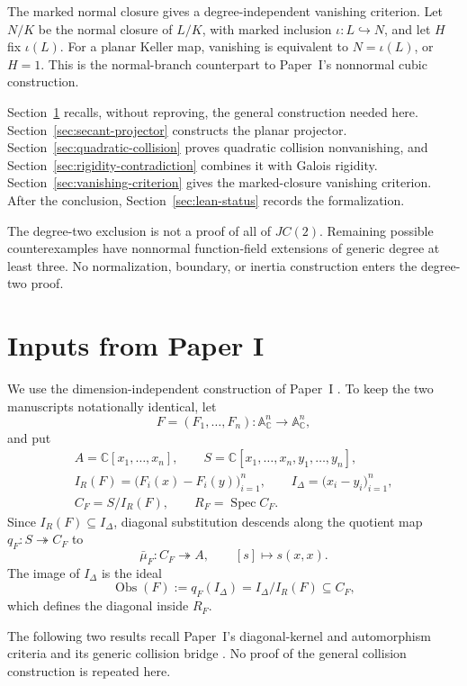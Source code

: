 \documentclass[11pt]{article}
\DeclareMathOperator{\Spec}{Spec}\DeclareMathOperator{\Frac}{Frac}
\newcommand{\A}{\mathbb A}
\newcommand{\C}{\mathbb C}
\newcommand{\Obs}{\operatorname{Obs}}
\begin{document}
The marked normal closure gives a degree-independent vanishing criterion.
Let \(N/K\) be the normal closure of \(L/K\), with marked inclusion
\(\iota\colon L\hookrightarrow N\), and let \(H\) fix \(\iota(L)\).
For a planar Keller map, vanishing is equivalent to \(N=\iota(L)\), or
\(H=1\).  This is the normal-branch counterpart to Paper~I's nonnormal
cubic construction.

Section~\ref{sec:collision-inputs} recalls, without reproving, the general
construction needed here.  Section~\ref{sec:secant-projector} constructs
the planar projector.  Section~\ref{sec:quadratic-collision} proves
quadratic collision nonvanishing, and
Section~\ref{sec:rigidity-contradiction} combines it with Galois rigidity.
Section~\ref{sec:vanishing-criterion} gives the marked-closure vanishing
criterion.  After the conclusion, Section~\ref{sec:lean-status} records
the formalization.

The degree-two exclusion is not a proof of all of \(JC(2)\).  Remaining
possible counterexamples have nonnormal function-field extensions of
generic degree at least three.  No normalization, boundary, or inertia
construction enters the degree-two proof.

\section{Inputs from Paper I}
\label{sec:collision-inputs}

We use the dimension-independent construction of Paper~I
\cite{VanDerVlugt2026CubicCollision}.  To keep the two manuscripts
notationally identical, let
\[
  F=(F_1,\dots,F_n)\colon\A^n_{\C}\longrightarrow\A^n_{\C},
\]
and put
\[
  \begin{gathered}
  A=\C[x_1,\dots,x_n],\qquad
  S=\C[x_1,\dots,x_n,y_1,\dots,y_n],\\
  I_R(F)=\bigl(F_i(x)-F_i(y)\bigr)_{i=1}^n,\qquad
  I_\Delta=\bigl(x_i-y_i\bigr)_{i=1}^n,\\
  C_F=S/I_R(F),\qquad
  R_F=\Spec C_F.
  \end{gathered}
\]
Since \(I_R(F)\subseteq I_\Delta\), diagonal substitution descends along
the quotient map \(q_F\colon S\twoheadrightarrow C_F\) to
\[
  \bar\mu_F\colon C_F\twoheadrightarrow A,
  \qquad [s]\longmapsto s(x,x).
\]
The image of \(I_\Delta\) is the ideal
\[
  \Obs(F):=q_F(I_\Delta)=I_\Delta/I_R(F)\subseteq C_F,
\]
which defines the diagonal inside \(R_F\).

The following two results recall Paper~I's diagonal-kernel and automorphism
criteria \cite[Proposition~2.2 and Theorem~2.7]{VanDerVlugt2026CubicCollision}
and its generic collision bridge
\cite[Theorem~2.5]{VanDerVlugt2026CubicCollision}.  No proof of the general
collision construction is repeated here.
\end{document}
